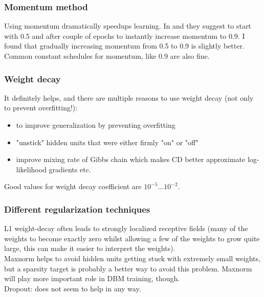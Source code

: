 \subsubsection{Momentum method}
\good Using momentum dramatically speedups learning. In \cite{hinton2010practical} and \cite{dbm_code} they suggest to start with 0.5 and after couple of epochs to instantly increase momentum to 0.9. I found that gradually increasing momentum from 0.5 to 0.9 is slightly better. Common constant schedules for momentum, like 0.9 are also fine.

\subsubsection{Weight decay}
\good It definitely helps, and there are multiple reasons to use weight decay (not only to prevent overfitting!):
\begin{itemize}
	\item to improve generalization by preventing overfitting
	\item "unstick" hidden units that were either firmly "on" or "off"
	\item improve mixing rate of Gibbs chain which makes CD better approximate log-likelihood gradients etc.
\end{itemize}
Good values for weight decay coefficient are $10^{-5}\ldots10^{-2}$.

\subsubsection{Different regularization techniques}
\textbullet{} L1 weight-decay often leads to strongly localized receptive fields (many of the weights to become exactly zero whilst allowing a few of the weights to grow quite large, this can make it easier to interpret the weights).
\\
\textbullet{} Maxnorm helps to avoid hidden units getting stuck with extremely small weights, but a sparsity target is probably a better way to avoid this problem. Maxnorm will play more important role in DBM training, though.
\\
\textbullet{} Dropout: does not seem to help in any way.  

